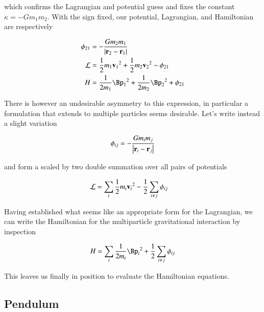 which confirms the Lagrangian and potential guess and fixes the constant $\kappa = - G m_1 m_2$.  With the sign fixed, our potential, Lagrangian, and Hamiltonian are respectively

\begin{align}\label{eqn:hamiltonian:moo5}
\phi_{21} &= -\frac{G m_2 m_1 }{\Abs{\Br_2 - \Br_1}}  \\
\LL &= \inv{2} m_1 {\Bv_1}^2 +\inv{2} m_2 {\Bv_2}^2 - \phi_{21} \\
H &= \inv{2 m_1} {\Bp_1}^2 +\inv{2 m_2} {\Bp_2}^2 + \phi_{21}
\end{align}

There is however an undesirable asymmetry to this expression, in particular a formulation that extends to multiple particles seems desirable.  Let's write instead a slight variation

\begin{align}\label{eqn:hamiltonian:moo6}
\phi_{ij} = - \frac{G m_i m_j}{\left\lvert{\mathbf{r}_i - \mathbf{r}_j}\right\rvert}
\end{align}

and form a scaled by two double summation over all pairs of potentials

\begin{align}\label{eqn:hamiltonian:moo7}
\mathcal{L} &= \sum_i \frac{1}{2} m_i {\mathbf{v}_i}^2 - \frac{1}{2} \sum_{i \ne j} \phi_{ij}
\end{align}

%

Having established what seems like an appropriate form for the Lagrangian, we can write the Hamiltonian for the multiparticle gravitational interaction by inspection

\begin{align}\label{eqn:hamiltonian:moo9}
H = \sum_i \inv{2 m_i} {\Bp_i}^2 + \inv{2} \sum_{i \ne j} \phi_{ij}
\end{align}

This leaves us finally in position to evaluate the Hamiltonian equations.

\subsection{Pendulum}

